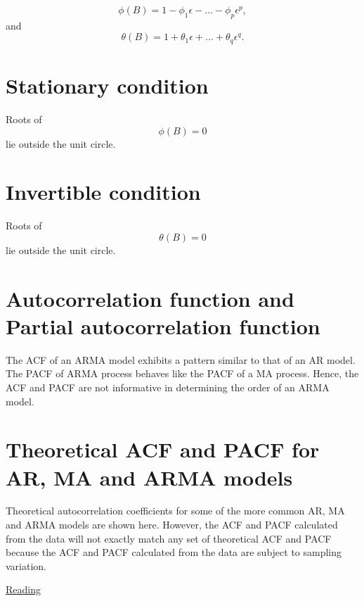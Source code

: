 \documentclass[
  11pt,
  a4paper,
]{report}
\begin{document}
\[\phi(B)=1-\phi_1 \epsilon -...-\phi_p \epsilon^p,\] and
\[\theta(B)=1+\theta_1\epsilon+...+\theta_q\epsilon^q.\]

\section{Stationary condition}\label{stationary-condition}

Roots of \[\phi(B)=0\] lie outside the unit circle.

\section{Invertible condition}\label{invertible-condition}

Roots of \[\theta(B)=0\] lie outside the unit circle.

\section{Autocorrelation function and Partial autocorrelation
function}\label{autocorrelation-function-and-partial-autocorrelation-function}

The ACF of an ARMA model exhibits a pattern similar to that of an AR
model. The PACF of ARMA process behaves like the PACF of a MA process.
Hence, the ACF and PACF are not informative in determining the order of
an ARMA model.

\section{Theoretical ACF and PACF for AR, MA and ARMA
models}\label{theoretical-acf-and-pacf-for-ar-ma-and-arma-models}

Theoretical autocorrelation coefficients for some of the more common AR,
MA and ARMA models are shown here. However, the ACF and PACF calculated
from the data will not exactly match any set of theoretical ACF and PACF
because the ACF and PACF calculated from the data are subject to
sampling variation.

\href{https://www.xycoon.com/ar2_process.htm}{Reading}
\end{document}
